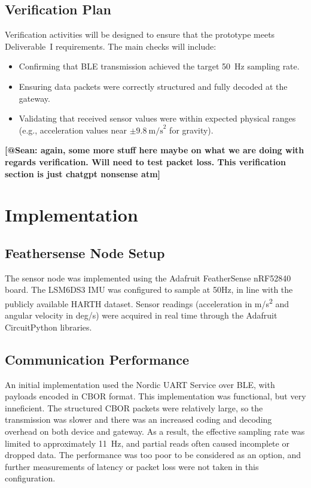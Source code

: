\documentclass[conference]{lib/IEEEtran}
\begin{document}
\subsection{Verification Plan}
Verification activities will be designed to ensure that the prototype meets Deliverable~I requirements. The main checks will include:
\begin{itemize}
	\item Confirming that BLE transmission achieved the target 50~Hz sampling rate. 
	\item Ensuring data packets were correctly structured and fully decoded at the gateway. 
	\item Validating that received sensor values were within expected physical ranges (e.g., acceleration values near $\pm 9.8~\text{m/s}^2$ for gravity). 
\end{itemize}

\textbf{[@Sean: again, some more stuff here maybe on what we are doing with regards verification. Will need to test packet loss. This verification section is just chatgpt nonsense atm]}

\section{Implementation}
\subsection{Feathersense Node Setup}
The sensor node was implemented using the Adafruit FeatherSense nRF52840 board. The LSM6DS3 IMU was configured to sample at 50Hz, in line with the publicly available HARTH dataset. Sensor readings (acceleration in m/s\textsuperscript{2} and angular velocity in deg/s) were acquired in real time through the Adafruit CircuitPython libraries. 

\subsection{Communication Performance}
An initial implementation used the Nordic UART Service over BLE, with payloads encoded in CBOR format. This implementation was functional, but very inneficient. The structured CBOR packets were relatively large, so the transmission was slower and there was an increased coding and decoding overhead on both device and gateway. As a result, the effective sampling rate was limited to approximately 11~Hz, and partial reads often caused incomplete or dropped data. The performance was too poor to be considered as an option, and further measurements of latency or packet loss were not taken in this configuration. 
\end{document}
